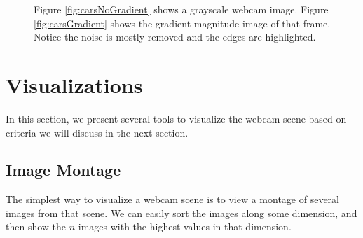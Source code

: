 \begin{figure}
	\centering
		\caption[Focusing on object edges with gradient magnitude images.]{Figure \ref{fig:carsNoGradient} shows a grayscale webcam image. Figure \ref{fig:carsGradient} shows the gradient magnitude image of that frame.  Notice the noise is mostly removed and the edges are highlighted.}
\end{figure}

\section{Visualizations}

In this section, we present several tools to visualize the webcam scene based on criteria we will discuss in the next section.


\subsection{Image Montage}

The simplest way to visualize a webcam scene is to view a montage of several images from that scene.  We can easily sort the images along some dimension, and then show the $n$ images with the highest values in that dimension.

